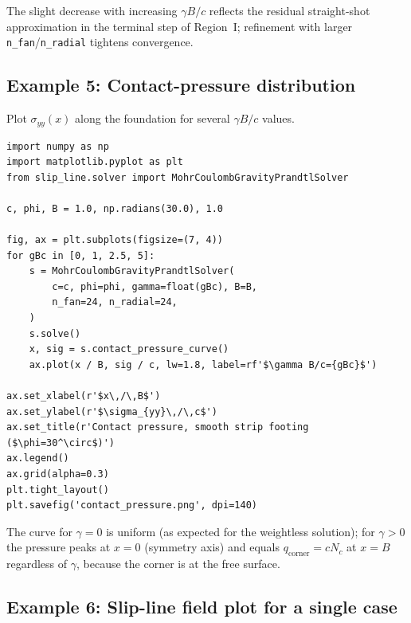 \documentclass[11pt,a4paper]{article}
\newcommand{\Nc}{N_c}
\begin{document}
The slight decrease with increasing $\gamma B/c$ reflects the residual
straight-shot approximation in the terminal step of Region~I; refinement
with larger \texttt{n\_fan}/\texttt{n\_radial} tightens convergence.

\subsection{Example 5: Contact-pressure distribution}
\label{ex:contact}

Plot $\sigma_{yy}(x)$ along the foundation for several $\gamma B/c$
values.

\begin{lstlisting}
import numpy as np
import matplotlib.pyplot as plt
from slip_line.solver import MohrCoulombGravityPrandtlSolver

c, phi, B = 1.0, np.radians(30.0), 1.0

fig, ax = plt.subplots(figsize=(7, 4))
for gBc in [0, 1, 2.5, 5]:
    s = MohrCoulombGravityPrandtlSolver(
        c=c, phi=phi, gamma=float(gBc), B=B,
        n_fan=24, n_radial=24,
    )
    s.solve()
    x, sig = s.contact_pressure_curve()
    ax.plot(x / B, sig / c, lw=1.8, label=rf'$\gamma B/c={gBc}$')

ax.set_xlabel(r'$x\,/\,B$')
ax.set_ylabel(r'$\sigma_{yy}\,/\,c$')
ax.set_title(r'Contact pressure, smooth strip footing ($\phi=30^\circ$)')
ax.legend()
ax.grid(alpha=0.3)
plt.tight_layout()
plt.savefig('contact_pressure.png', dpi=140)
\end{lstlisting}

The curve for $\gamma=0$ is uniform (as expected for the weightless
solution); for $\gamma>0$ the pressure peaks at $x=0$ (symmetry axis)
and equals $q_\text{corner} = c\Nc$ at $x=B$ regardless of $\gamma$,
because the corner is at the free surface.

\subsection{Example 6: Slip-line field plot for a single case}
\label{ex:single_plot}
\end{document}
